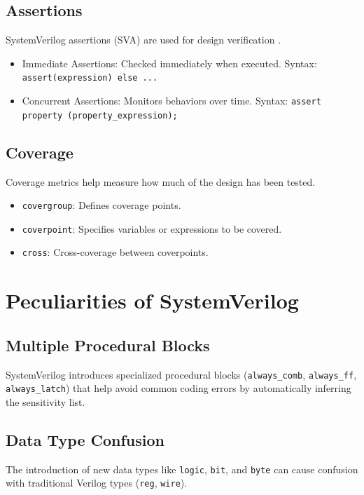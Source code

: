 \subsection{Assertions}
SystemVerilog assertions (SVA) are used for design verification \cite{foster2003assertions}.
\begin{itemize}
    \item Immediate Assertions: Checked immediately when executed.
        \newline Syntax: \texttt{assert(expression) else ...}
    \item Concurrent Assertions: Monitors behaviors over time.
        \newline Syntax: \texttt{assert property (property\_expression);}
\end{itemize}

\subsection{Coverage}
Coverage metrics help measure how much of the design has been tested.
\begin{itemize}
    \item \texttt{covergroup}: Defines coverage points.
    \item \texttt{coverpoint}: Specifies variables or expressions to be covered.
    \item \texttt{cross}: Cross-coverage between coverpoints.
\end{itemize}

\section{Peculiarities of SystemVerilog}

\subsection{Multiple Procedural Blocks}
SystemVerilog introduces specialized procedural blocks (\texttt{always\_comb}, \texttt{always\_ff}, \texttt{always\_latch}) that help avoid common coding errors by automatically inferring the sensitivity list.

\subsection{Data Type Confusion}
The introduction of new data types like \texttt{logic}, \texttt{bit}, and \texttt{byte} can cause confusion with traditional Verilog types (\texttt{reg}, \texttt{wire}).


